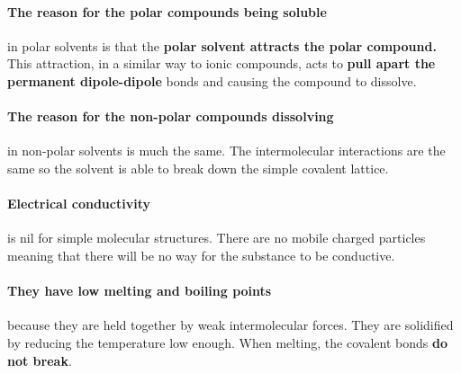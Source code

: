 	\paragraph{The reason for the polar compounds being soluble} in polar solvents is that the \textbf{polar solvent attracts the polar compound.}
	This attraction, in a similar way to ionic compounds, acts to \textbf{pull apart the permanent dipole-dipole} bonds and causing the compound to dissolve.
	
	\paragraph{The reason for the non-polar compounds dissolving} in non-polar solvents is much the same.
	The intermolecular interactions are the same so the solvent is able to break down the simple covalent lattice.
	
	\paragraph{Electrical conductivity} is nil for simple molecular structures.
	There are no mobile charged particles meaning that there will be no way for the substance to be conductive.
    \paragraph{They have low melting and boiling points} because they are held together by weak intermolecular forces. They are solidified by reducing the temperature low enough. When melting, the covalent bonds \textbf{do not break}.